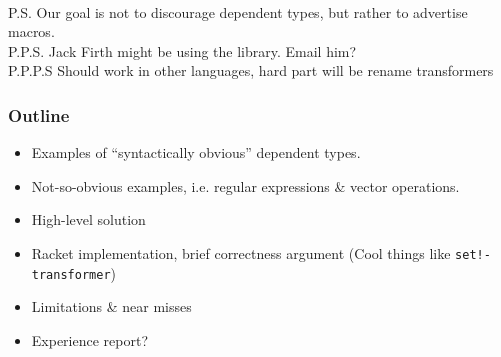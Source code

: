 \documentclass{article}
\begin{document}
~
\\P.S. Our goal is not to discourage dependent types, but rather to advertise macros.
\\P.P.S. Jack Firth might be using the library. Email him?
\\P.P.P.S Should work in other languages, hard part will be rename transformers


\subsubsection*{Outline}
\begin{itemize}
\item Examples of ``syntactically obvious'' dependent types.
\item Not-so-obvious examples, i.e. regular expressions \& vector operations.
\item High-level solution
\item Racket implementation, brief correctness argument
\subitem (Cool things like {\tt set!-transformer})
\item Limitations \& near misses
\item Experience report?
\end{itemize}
\end{document}
